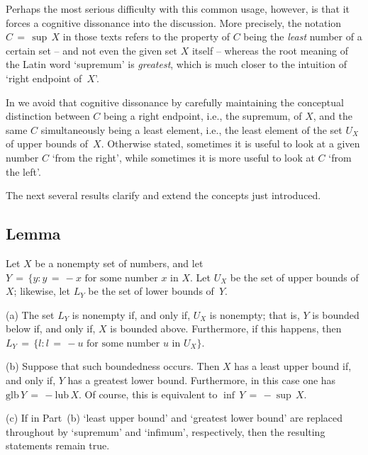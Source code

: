         Perhaps the most serious difficulty with this common usage, however, is that it forces a cognitive dissonance into the discussion.
    More precisely, the notation $C \,=\, {\sup}\,X$ in those texts refers to the property of $C$ being the {\em least} number of a certain set
    -- and not even the given set $X$ itself -- whereas the root meaning of the Latin word `supremum' is {\em greatest},
    which is much closer to the intuition of `right endpoint of~$X$'.

        In {\ThisText} we avoid that cognitive dissonance by carefully maintaining the conceptual distinction between $C$ being a right endpoint,
    i.e., the supremum, of $X$, and the same $C$ simultaneously being a least element, i.e., the least element of the set $U_{X}$ of upper bounds of~$X$.
    Otherwise stated, sometimes it is useful to look at a given number $C$ `from the right', while sometimes it is more useful to look at $C$ `from the left'.

\VV

        The next several results clarify and extend the concepts just introduced.

\V

            \subsection{\small{\bf Lemma}}
            \label{LemmaB30.08J}

\V

        Let $X$ be a nonempty set of numbers, and let $Y \,=\, \{y:y \,=\, -x \mbox{ for some number $x$ in $X$}$.
    Let $U_{X}$ be the set of upper bounds of $X$;
    likewise, let $L_{Y}$ be the set of lower bounds of~$Y$.

\V

         (a) The set $L_{Y}$ is nonempty if, and only if, $U_{X}$ is nonempty;
    that is, $Y$ is bounded below if, and only if, $X$ is bounded above.
    Furthermore, if this happens, then $L_{Y} \,=\, \{l: l \,=\, -u \mbox{ for some number $u$ in $U_{X}$}\}$.

\V

         (b) Suppose that such boundedness occurs. Then $X$ has a least upper bound if, and only if, $Y$ has a greatest lower bound.
    Furthermore, in this case one has $\mbox{glb}\,Y \,=\, - \mbox{lub}\,X$. Of course, this is equivalent to ${\inf}\,Y \,=\, -{\sup}\,X$.

\V

         (c) If in Part~(b) `least upper bound' and `greatest lower bound' are replaced throughout by `supremum' and `infimum', respectively,
    then the resulting statements remain true.

